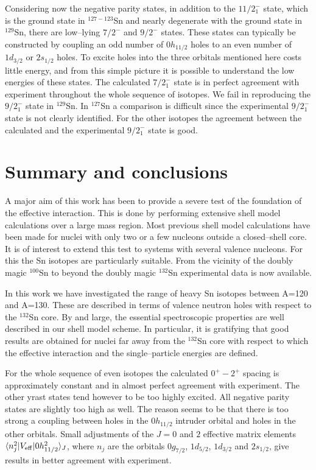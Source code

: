 Considering now the negative parity states, in addition to the $11/2^{-}_{1}$ 
state, which is the ground state in $^{127-123}$Sn and nearly degenerate with 
the ground state in $^{129}$Sn, there are low--lying $7/2^{-}$ and $9/2^{-}$ 
states. These states can typically be constructed by coupling an odd
number of $0h_{11/2}$ holes to an even number of $1d_{3/2}$ or $2s_{1/2}$ 
holes. To excite holes into the three orbitals mentioned here costs little 
energy, and from this simple picture it is possible to understand the low 
energies of these states.
The calculated $7/2^{-}_{1}$ state is in perfect agreement with experiment 
throughout the whole sequence of isotopes. We fail in reproducing the 
$9/2^{-}_{1}$ state in $^{129}$Sn. In $^{127}$Sn a comparison is difficult 
since the experimental $9/2^{-}_{1}$ state is not clearly identified. For the 
other isotopes the agreement between the calculated and the experimental 
$9/2^{-}_{1}$ state is good.

\section{Summary and conclusions}

A major aim of this work has been to provide a severe test of the foundation
of the effective  interaction. This is done by performing extensive shell
model calculations over a large mass region.
Most previous shell model calculations have been made for nuclei with only 
two or a few nucleons outside a closed--shell core. It is of interest to 
extend  this test to systems with several valence nucleons. For this the Sn 
isotopes are particularly suitable. From the vicinity of the doubly magic 
$^{100}$Sn to beyond the doubly magic $^{132}$Sn experimental data is now 
available. 

In this work we have investigated the range of heavy Sn isotopes between 
A=120 and A=130. These are described in terms of valence neutron holes with 
respect to the $^{132}$Sn core. By and large, the essential spectroscopic 
properties are well described in our shell model scheme. In particular, it 
is gratifying that good results are obtained for nuclei far away from the 
$^{132}$Sn core with respect to which the effective interaction and the 
single--particle energies are defined.

For the whole sequence of even isotopes the calculated $0^{+} - 2^{+}$ 
spacing is approximately constant and in almost perfect agreement with 
experiment. The other yrast states tend however to be too highly excited. 
All negative parity states are slightly too high as well. The reason seems
to be that there is too strong a coupling between holes in the 
$0h_{11/2}$ intruder orbital and holes in the other orbitals. Small 
adjustments of the $J=0$ and $2$ effective matrix elements 
$\langle n_{j}^{2}|V_{\rm eff}|0h_{11/2}^{2} \rangle _{J}$, where $n_{j}$ 
are the orbitals $0g_{7/2}$, $1d_{5/2}$, $1d_{3/2}$ and $2s_{1/2}$, give 
results in better agreement with experiment.

